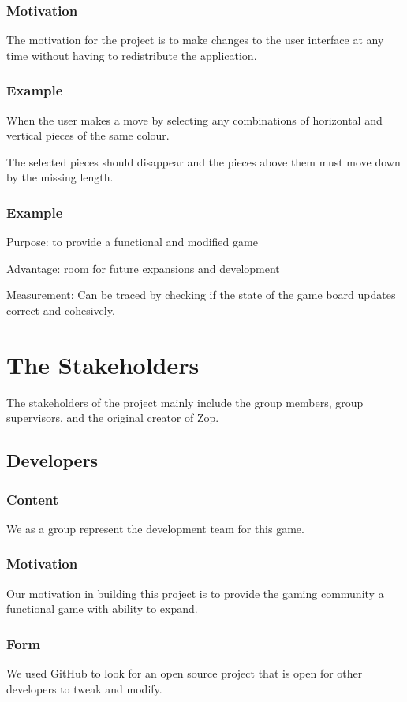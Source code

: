 \documentclass[12pt]{article}
\begin{document}
\subsubsection{Motivation}
 The motivation for the project is to make changes to the user interface at any time without having to redistribute the application.
\subsubsection{Example}
When the user makes a move by selecting any combinations of horizontal and vertical pieces of the same colour.

The selected pieces should disappear and the pieces above them must move down by the missing length.
\subsubsection{Example}
Purpose: to provide a functional and modified game

Advantage: room for future expansions and development

Measurement: Can be traced by checking if the state of the game board updates correct and cohesively.

\section{The Stakeholders}
The stakeholders of the project mainly include the group members, group supervisors, and the original creator of Zop.

\subsection{Developers}
\subsubsection{Content}
 We as a group represent the development team for this game.
\subsubsection{Motivation}
 Our motivation in building this project is to provide the gaming community a functional game with ability to expand.
\subsubsection{Form}
 We used GitHub to look for an open source project that is open for other developers to tweak and modify.
\end{document}

